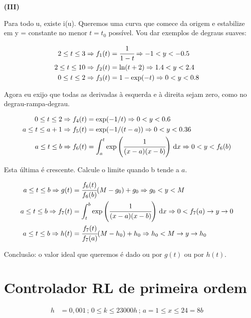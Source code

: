 \documentclass[12pt]{article}
\begin{document}
\textbf{(III)}

Para todo u, existe i(u). Queremos uma curva que comece da origem e estabilize em y = constante no menor $t = t_0$ poss\'ivel. Vou dar exemplos de degraus suaves:

\begin{align}
  2 \le t \le 3 \Rightarrow f_1(t) &= \cfrac{1}{1 - t} \Rightarrow -1 < y < -0.5 \\
  2 \le t \le 10 \Rightarrow f_2(t) &= \ln(t + 2) \Rightarrow 1.4 < y < 2.4 \\
  0 \le t \le 2 \Rightarrow f_3(t) &= 1 - \exp(-t) \Rightarrow 0 < y < 0.8
\end{align}

Agora eu exijo que todas as derivadas \`a esquerda e \`a direita sejam zero, como no degrau-rampa-degrau.

\begin{align}
  0 \le t \le 2 \Rightarrow f_4(t) &= \exp(-1/t) \Rightarrow 0 < y < 0.6 \\
  a \le t \le a + 1 \Rightarrow f_5(t) &= \exp(-1/(t - a)) \Rightarrow 0 < y < 0.36 \\
  a \le t \le b \Rightarrow f_6(t) &= \int_a^t \exp\left(\cfrac{1}{(x - a) (x - b)}\right)\,\mathrm{d}x \Rightarrow 0 < y < f_6(b)
\end{align}

Esta \'ultima \'e crescente. Calcule o limite quando b tende a $a$.

\begin{align}
  a \le t \le b \Rightarrow g(t) &= \cfrac{f_6(t)}{f_6(b)} (M - g_0) + g_0 \Rightarrow g_0 < y < M \\
  a \le t \le b \Rightarrow f_7(t) &= \int_t^b \exp\left(\cfrac{1}{(x - a) (x - b)}\right)\,\mathrm{d}x \Rightarrow 0 < f_7(a) \to y \to 0 \\
  a \le t \le b \Rightarrow h(t) &= \cfrac{f_7(t)}{f_7(a)} (M - h_0) + h_0 \Rightarrow h_0 < M \to y \to h_0
\end{align}

Conclus\~ao: o valor ideal que queremos \'e dado ou por $g(t)$ ou por $h(t)$.

\section{Controlador RL de primeira ordem}

\begin{align}
  h &= 0,001\,;\,0 \le k \le 23000 h\,;\,a = 1 \le x \le 24 = 8b
\end{align}
\end{document}
